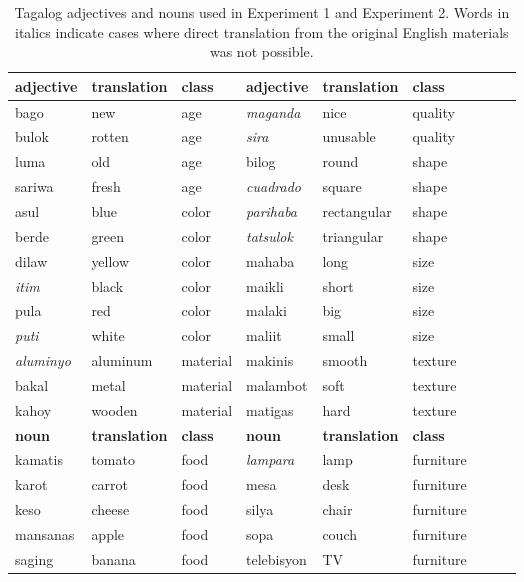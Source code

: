 \documentclass[12pt,letterpaper]{article}
\begin{document}
\begin{table}
\centering
{
    \begin{tabular}{lllllllll} \toprule
    \textbf{adjective}  & \textbf{translation} & \textbf{class} &  \textbf{adjective}  & \textbf{translation} & \textbf{class}\\ \midrule
    bago & new & age & \emph{maganda} & nice & quality \\
    bulok & rotten & age & \emph{sira} & unusable & quality \\
    luma & old & age & bilog & round & shape  \\
    sariwa & fresh & age & \emph{cuadrado} & square & shape  \\
    asul & blue & color & \emph{parihaba} & rectangular & shape \\
    berde & green & color & \emph{tatsulok} & triangular & shape  \\
    dilaw & yellow & color & mahaba & long & size \\
    \emph{itim} & black & color & maikli & short & size \\
    pula & red & color & malaki & big & size \\
    \emph{puti} & white & color & maliit & small & size  \\
    \emph{aluminyo} & aluminum & material & makinis & smooth & texture \\
    bakal & metal & material & malambot & soft & texture \\
    kahoy & wooden & material & matigas & hard & texture \\ \midrule
    \textbf{noun} & \textbf{translation} & \textbf{class} & \textbf{noun} & \textbf{translation} & \textbf{class}\\ \midrule
    kamatis & tomato & food &  \emph{lampara} & lamp & furniture \\
    karot & carrot & food & mesa & desk & furniture \\
    keso & cheese & food & silya & chair & furniture \\
    mansanas & apple & food & sopa & couch & furniture \\
    saging & banana & food & telebisyon & TV & furniture \\ \bottomrule
    \end{tabular}
    \caption{Tagalog adjectives and nouns used in Experiment 1 and Experiment 2. Words in italics indicate cases where direct translation from the original English materials was not possible.}
    \label{tagalog-materials}
    }
\end{table}
\end{document}
